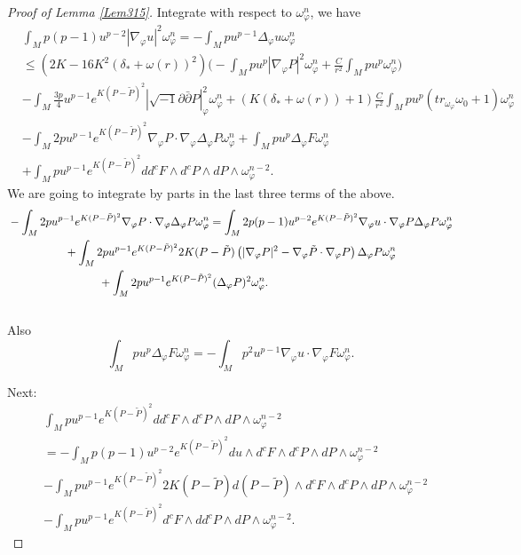 \documentclass[10pt,a4paper]{amsart}
\begin{document}
\begin{proof}[Proof of Lemma \ref{Lem315}]
Integrate with respect to $\omega_\varphi^n$, we have
\begin{equation}\label{4.135New}
\begin{split}
&\int_Mp(p-1)u^{p-2}|\nabla_{\varphi}u|^2\omega_{\varphi}^n=-\int_Mpu^{p-1}\Delta_{\varphi}u\omega_{\varphi}^n\\
&\le (2K-16K^2(\delta_*+\omega(r))^2)\bigg(-\int_Mpu^p|\nabla_{\varphi}P|^2\omega_{\varphi}^n+\frac{C}{r^2}\int_Mpu^p\omega_{\varphi}^n\bigg)\\
&-\int_M\frac{3p}{4}u^{p-1}e^{K(P-\tilde{P})^2}|\sqrt{-1}\partial\bar{\partial}P|^2_{\varphi}\omega_{\varphi}^n+(K(\delta_*+\omega(r))+1)\frac{C}{r^2}\int_Mpu^p(tr_{\omega_{\varphi}}\omega_0+1)\omega_{\varphi}^n\\
&-\int_M2pu^{p-1}e^{K(P-\tilde{P})^2}\nabla_{\varphi}P\cdot \nabla_{\varphi}\Delta_{\varphi}P\omega_{\varphi}^n+\int_Mpu^p\Delta_{\varphi}F\omega_{\varphi}^n\\
&+\int_Mpu^{p-1}e^{K(P-\tilde{P})^2}dd^cF\wedge d^cP\wedge dP\wedge \omega_{\varphi}^{n-2}.
\end{split}
\end{equation}
We are going to integrate by parts in the last three terms of the above.
\begin{align}\label{4.135N}
	&-\int_M2pu^{p-1}e^{K(P-\tilde P)^2}\nabla_{\varphi}P\cdot \nabla_{\varphi}\Delta_{\varphi}P\omega_{\varphi}^n =\int_M2p(p-1)u^{p-2}e^{K(P-\tilde P)^2}\nabla_{\varphi}u\cdot \nabla_{\varphi}P\Delta_{\varphi}P\omega_{\varphi}^n \notag \\
	&\quad\qquad\qquad +\int_M2pu^{p-1}e^{K(P-\tilde P)^2}2K (P-\tilde P)\left( |\nabla_{\varphi}P|^2-\nabla_\varphi\tilde P\cdot\nabla_\varphi P \right) \Delta_{\varphi}P\omega_{\varphi}^n \notag\\
	&\qquad\qquad\qquad\qquad + \int_M2pu^{p-1}e^{K(P-\tilde P)^2}(\Delta_{\varphi}P)^2\omega_{\varphi}^n.
\end{align}\\
Also
\begin{equation}\label{4.136}
\int_Mpu^p\Delta_{\varphi}F\omega_{\varphi}^n=-\int_Mp^2u^{p-1}\nabla_{\varphi}u\cdot \nabla_{\varphi}F\omega_{\varphi}^n.
\end{equation}

Next:
\begin{equation}\label{4.137}
\begin{split}
&\int_Mpu^{p-1}e^{K(P-\tilde{P})^2}dd^cF\wedge d^cP\wedge dP\wedge \omega_{\varphi}^{n-2}\\
&=-\int_Mp(p-1)u^{p-2}e^{K(P-\tilde{P})^2}du\wedge d^cF\wedge d^cP\wedge dP\wedge \omega_{\varphi}^{n-2}\\
&-\int_Mpu^{p-1}e^{K(P-\tilde{P})^2}2K(P-\tilde{P})d(P-\tilde{P})\wedge d^cF\wedge d^cP\wedge dP\wedge \omega_{\varphi}^{n-2}\\
&-\int_Mpu^{p-1}e^{K(P-\tilde{P})^2}d^cF\wedge dd^cP\wedge dP\wedge \omega_{\varphi}^{n-2}.
\end{split}
\end{equation}


\end{proof}
\end{document}
